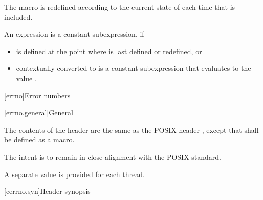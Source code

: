 \pnum
The macro  is redefined according to
the current state of  each time that
 is included.

\pnum
An expression 
is a constant subexpression, if
\begin{itemize}
\item
{} is defined at the point where 
is last defined or redefined, or
\item
{} contextually converted to 
is a constant subexpression that evaluates to the value .
\end{itemize}

[errno]{Error numbers}

[errno.general]{General}

\pnum
The contents of the header  are the same as the POSIX header
, except that  shall be defined as a macro.
\begin{note}
The intent is to remain in close alignment with the POSIX standard.
\end{note}
A separate  value is provided for each thread.

[cerrno.syn]{Header  synopsis}

